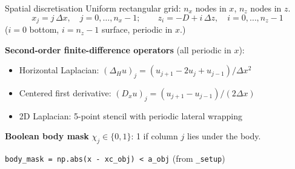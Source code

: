\documentclass[aspectratio=169, 10pt]{beamer}
\begin{document}

\begin{frame}{Spatial discretisation}
Uniform rectangular grid: $n_x$ nodes in $x$, $n_z$ nodes in $z$.
\[
x_j = j\,\Delta x, \quad j = 0,\dots, n_x{-}1; \qquad z_i = -D + i\,\Delta z, \quad i = 0,\dots, n_z{-}1
\]
($i=0$ bottom, $i=n_z-1$ surface, periodic in $x$.)

\vspace{0.6em}
\textbf{Second-order finite-difference operators} (all periodic in $x$):
\begin{itemize}
    \item Horizontal Laplacian: $(\Delta_H u)_j = (u_{j+1} - 2u_j + u_{j-1})/\Delta x^2$
    \item Centered first derivative: $(D_x u)_j = (u_{j+1} - u_{j-1})/(2\Delta x)$
    \item 2D Laplacian: 5-point stencil with periodic lateral wrapping
\end{itemize}

\vspace{0.6em}
\textbf{Boolean body mask} $\chi_j \in \{0,1\}$: 1 if column $j$ lies under the body.

\vspace{0.3em}
\small
\lstinline{body_mask = np.abs(x - xc_obj) < a_obj}  (from \texttt{\_setup})
\end{frame}
\end{document}
